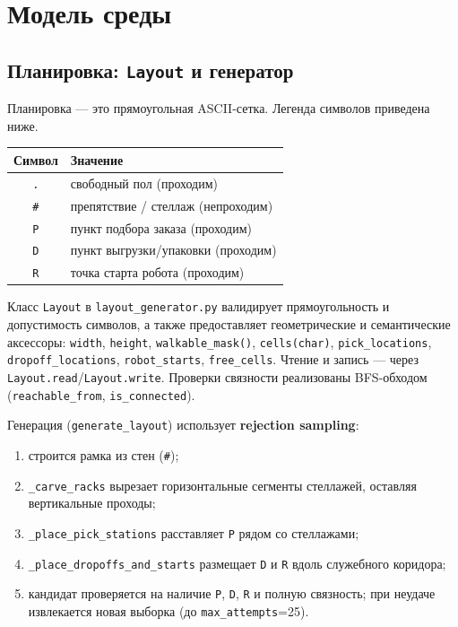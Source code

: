 \documentclass[11pt,a4paper]{article}
\newcommand{\code}[1]{\texttt{#1}}
\begin{document}
\section{Модель среды}
\subsection{Планировка: \code{Layout} и генератор}
Планировка — это прямоугольная ASCII-сетка. Легенда символов приведена ниже.

\begin{center}
\begin{tabular}{@{}cl@{}}
\toprule
\textbf{Символ} & \textbf{Значение} \\
\midrule
\code{.} & свободный пол (проходим) \\
\code{\#} & препятствие / стеллаж (непроходим) \\
\code{P} & пункт подбора заказа (проходим) \\
\code{D} & пункт выгрузки/упаковки (проходим) \\
\code{R} & точка старта робота (проходим) \\
\bottomrule
\end{tabular}
\end{center}

Класс \code{Layout} в \code{layout\_generator.py} валидирует
прямоугольность и допустимость символов, а также предоставляет геометрические и
семантические аксессоры: \code{width}, \code{height}, \code{walkable\_mask()},
\code{cells(char)}, \code{pick\_locations}, \code{dropoff\_locations},
\code{robot\_starts}, \code{free\_cells}. Чтение и запись — через
\code{Layout.read}/\code{Layout.write}. Проверки связности реализованы BFS-обходом
(\code{reachable\_from}, \code{is\_connected}).

Генерация (\code{generate\_layout}) использует \textbf{rejection sampling}:
\begin{enumerate}[nosep]
\item строится рамка из стен (\code{\#});
\item \code{\_carve\_racks} вырезает горизонтальные сегменты стеллажей,
оставляя вертикальные проходы;
\item \code{\_place\_pick\_stations} расставляет \code{P} рядом со стеллажами;
\item \code{\_place\_dropoffs\_and\_starts} размещает \code{D} и \code{R} вдоль
служебного коридора;
\item кандидат проверяется на наличие \code{P}, \code{D}, \code{R} и полную
связность; при неудаче извлекается новая выборка (до \code{max\_attempts}=25).
\end{enumerate}
\end{document}
